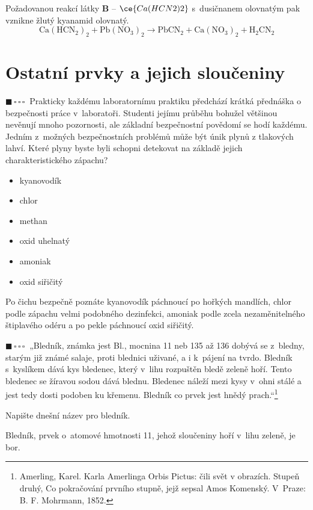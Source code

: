 \documentclass{book}
\newcommand{\jeden}{$\blacksquare \, \square \, \square \, \square \; \; $}
\renewenvironment{quotation}{\par}{\par} %
\begin{document}
Požadovanou reakcí látky \textbf{B} -- $\ce{Ca(HCN2)2}$ s~dusičnanem
olovnatým pak vznikne žlutý kyanamid olovnatý.
\[
\mathrm{Ca(HCN_{2})_{2}+Pb(NO_{3})_{2}\rightarrow PbCN_{2}+Ca(NO_{3})_{2}+H_{2}CN_{2}}
\]

\newpage %
\section{Ostatní prvky a jejich sloučeniny}

\begin{quotation}
\jeden Prakticky každému laboratornímu praktiku předchází krátká přednáška
o bezpečnosti práce v~laboratoři. Studenti jejímu průběhu bohužel většinou
nevěnují mnoho pozornosti, ale základní bezpečnostní povědomí se hodí
každému. Jedním z~možných bezpečnostních problémů může být únik plynů
z tlakových lahví. Které plyny byste byli schopni detekovat na základě
jejich charakteristického zápachu? 
\begin{itemize}
\item kyanovodík 
\item chlor 
\item methan 
\item oxid uhelnatý 
\item amoniak 
\item oxid siřičitý
\end{itemize}
\end{quotation} \dotfill \par 
Po čichu bezpečně poznáte kyanovodík páchnoucí po hořkých mandlích,
chlor podle zápachu velmi podobného dezinfekci, amoniak podle zcela
nezaměnitelného štiplavého odéru a po pekle páchnoucí oxid siřičitý.

\hrulefill %
\begin{quotation}
\jeden „Bledník, známka jest Bl., mocnina 11 neb 135 až 136 dobývá se z~bledny,
starým již známé salaje, proti blednici uživané, a i k~pájení na tvrdo.
Bledník s~kyslíkem dává kys bledenec, který v~lihu rozpuštěn bledě
zeleně hoří. Tento bledenec se žíravou sodou dává blednu. Bledenec
náleží mezi kysy v~ohni stálé a jest tedy dosti podoben ku křemenu.
Bledník co prvek jest hnědý prach.“\footnote{Amerling, Karel. Karla Amerlinga Orbis Pictus: čili svět v
obrazích. Stupeň druhý, Co pokračování prvního stupně, jejž sepsal
Amos Komenský. V~Praze: B. F. Mohrmann, 1852.}

Napište dnešní název pro bledník.
\end{quotation} \dotfill \par 
Bledník, prvek o~atomové hmotnosti 11, jehož sloučeniny hoří v~lihu zeleně,
je bor.
\end{document}
